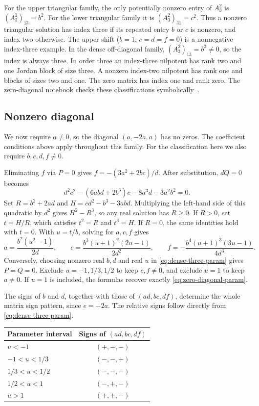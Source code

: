 \documentclass[11pt,a4paper]{article}
\begin{document}
For the upper triangular family, the only potentially nonzero entry
of $A_3^2$ is $(A_3^2)_{13}=b^2$. For the lower triangular family it is
$(A_3^2)_{31}=c^2$. Thus a nonzero triangular solution has index
three if its repeated entry $b$ or $c$ is nonzero, and index two otherwise.
The upper shift ($b=1$, $c=d=f=0$) is a nonnegative index-three example.
In the dense off-diagonal family, $(A_3^2)_{13}=b^2\ne0$, so the index is
always three. In order three an index-three nilpotent has rank two and
one Jordan block of size three. A nonzero index-two nilpotent has rank
one and blocks of sizes two and one. The zero matrix has index one and
rank zero. The zero-diagonal notebook checks these classifications
symbolically~\cite{zero-diagonal-notebook}.

\subsection{Nonzero diagonal}
\label{sec:nonzero-diagonal-three}

We now require $a\ne0$, so the diagonal $(a,-2a,a)$ has no zeros.
The coefficient conditions above apply throughout this family.
For the classification here we also require $b,c,d,f\ne0$.

Eliminating $f$ via $P=0$ gives $f=-(3a^2+2bc)/d$. After substitution,
$dQ=0$ becomes
\[
 d^2c^2-(6abd+2b^3)c-8a^3d-3a^2b^2=0.
\]
Set $R=b^2+2ad$ and $H=cd^2-b^3-3abd$. Multiplying the left-hand
side of this quadratic by $d^2$ gives $H^2-R^3$, so any real
solution has $R\ge0$. If $R>0$, set $t=H/R$, which satisfies
$t^2=R$ and $t^3=H$. If $R=0$, the same identities hold with $t=0$.
With $u=t/b$, solving for $a,c,f$ gives
\begin{equation}\label{eq:dense-three-param}
 a=\frac{b^2(u^2-1)}{2d},\qquad
 c=\frac{b^3(u+1)^2(2u-1)}{2d^2},\qquad
 f=-\frac{b^4(u+1)^3(3u-1)}{4d^3}.
\end{equation}
Conversely, choosing nonzero real $b,d$ and real $u$ in
\eqref{eq:dense-three-param} gives $P=Q=0$. Exclude $u=-1,1/3,1/2$
to keep $c,f\ne0$, and exclude $u=1$ to keep $a\ne0$. If $u=1$ is
included, the formulas recover exactly \eqref{eq:zero-diagonal-param}.

The signs of $b$ and $d$, together with those of $(ad,bc,df)$,
determine the whole matrix sign pattern, since $e=-2a$. The relative
signs follow directly from \eqref{eq:dense-three-param}.

\begin{center}
\begin{tabular}{lc}
\hline
Parameter interval & Signs of $(ad,bc,df)$\\ \hline
$u<-1$ & $(+,-,-)$\\
$-1<u<1/3$ & $(-,-,+)$\\
$1/3<u<1/2$ & $(-,-,-)$\\
$1/2<u<1$ & $(-,+,-)$\\
$u>1$ & $(+,+,-)$\\ \hline
\end{tabular}
\end{center}
\end{document}
